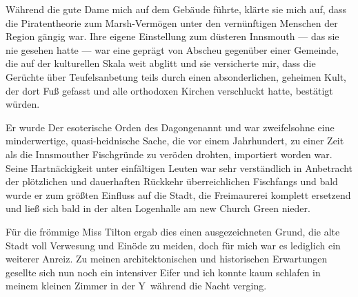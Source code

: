 Während die gute Dame mich auf dem Gebäude führte, klärte sie mich auf, dass die Piratentheorie zum Marsh-Vermögen unter den vernünftigen Menschen der Region gängig war. Ihre eigene Einstellung zum düsteren Innsmouth --- das sie nie gesehen hatte --- war eine geprägt von Abscheu gegenüber einer Gemeinde, die auf der kulturellen Skala weit abglitt und sie versicherte mir, dass die Gerüchte über Teufelsanbetung teils durch einen absonderlichen, geheimen Kult, der dort Fuß gefasst und alle orthodoxen Kirchen verschluckt hatte, bestätigt würden.

Er wurde \glqq Der esoterische Orden des Dagon\grqq  genannt und war zweifelsohne eine minderwertige, quasi-heidnische Sache, die vor einem Jahrhundert, zu einer Zeit als die Innsmouther Fischgründe zu veröden drohten, importiert worden war. Seine Hartnäckigkeit unter einfältigen Leuten war sehr verständlich in Anbetracht der plötzlichen und dauerhaften Rückkehr überreichlichen Fischfangs und bald wurde er zum größten Einfluss auf die Stadt, die Freimaurerei komplett ersetzend und ließ sich bald in der alten Logenhalle am new Church Green nieder.

Für die frömmige Miss Tilton ergab dies einen ausgezeichneten Grund, die alte Stadt voll Verwesung und Einöde zu meiden, doch für mich war es lediglich ein weiterer Anreiz. Zu meinen architektonischen und historischen Erwartungen gesellte sich nun noch ein intensiver Eifer und ich konnte kaum schlafen in meinem kleinen Zimmer in der \glqq Y\grqq\ während die Nacht verging.

